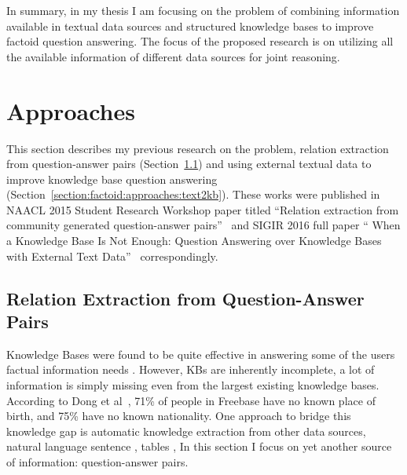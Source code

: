 In summary, in my thesis I am focusing on the problem of combining information available in textual data sources and structured knowledge bases to improve factoid question answering.
The focus of the proposed research is on utilizing all the available information of different data sources for joint reasoning.

\section{Approaches}
\label{section:factoid:approaches}

This section describes my previous research on the problem, \ie relation extraction from question-answer pairs (Section~\ref{section:factoid:approaches:cqarelextract}) and using external textual data to improve knowledge base question answering (Section~\ref{section:factoid:approaches:text2kb}).
These works were published in NAACL 2015 Student Research Workshop paper titled ``Relation extraction from community generated question-answer pairs''~\cite{savenkov2015relation} and SIGIR 2016 full paper ``
When a Knowledge Base Is Not Enough: Question Answering over Knowledge Bases with External Text Data''~\cite{Savenkov:2016:KBE:2911451.2911536} correspondingly.


\subsection{Relation Extraction from Question-Answer Pairs}
\label{section:factoid:approaches:cqarelextract}

Knowledge Bases were found to be quite effective in answering some of the users factual information needs \cite{unger2014introduction}.
However, KBs are inherently incomplete, \ie a lot of information is simply missing even from the largest existing knowledge bases.
According to Dong et al~\cite{Dong:2014:KVW:2623330.2623623}, 71\% of people in
Freebase have no known place of birth, and 75\% have no known nationality.
One approach to bridge this knowledge gap is automatic knowledge extraction from other data sources, \eg natural language sentence \cite{Agichtein:2000:SER:336597.336644,Gupta:2014:BOS:2732286.2732288,jijkoun2004information,MintzBSJ09}, tables \cite{Cafarella:2008:WEP:1453856.1453916}, \etc
In this section I focus on yet another source of information: question-answer pairs.

